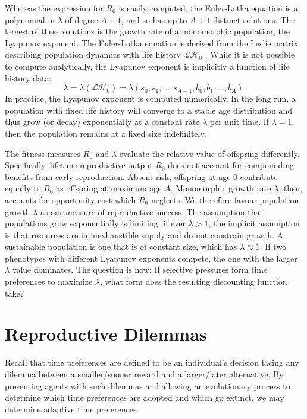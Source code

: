 \documentclass[titlepage, hidelinks, 12pt]{article}
\theoremstyle{plain}
\theoremstyle{remark}
\theoremstyle{definition}
\newcommand{\LH}{\mathcal{LH}}
\begin{document}
Whereas the expression for $R_0$ is easily computed, the Euler-Lotka equation
is a polynomial in $\lambda$ of degree $A+1$, and so has up to $A+1$ distinct solutions. The largest of these solutions is the growth
rate of a monomorphic population, the Lyapunov exponent.
The Euler-Lotka equation is derived from the Leslie matrix describing population dynamics with life history $\LH_0$ \cite{stearns92}.
While it is not possible to compute analytically, the Lyapunov exponent is implicitly a function of life history data:
\begin{equation}
    \lambda = \lambda(\LH_0) = \lambda(s_0, s_1, \ldots, s_{A-1}, b_0, b_1, \ldots, b_{A}).
    \label{eqn:lambda_function}
\end{equation}
In practice, the Lyapunov exponent is computed numerically. 
In the long run, a population with fixed life history will converge to a stable age distribution and
thus grow (or decay) 
exponentially at a constant rate $\lambda$ per unit time. If $\lambda = 1$, then the population remains at a fixed size indefinitely.

The fitness measures $R_0$ and $\lambda$ evaluate the relative value of offspring differently. Specifically, lifetime reproductive 
output $R_0$ does not account for compounding benefits from early reproduction. Absent risk, offspring at age $0$ contribute equally to
$R_0$ as offspring at maximum age $A$. Monomorphic growth rate $\lambda$, then, accounts for opportunity cost which $R_0$ neglects. 
We therefore favour population growth $\lambda$ as our measure of reproductive success. The assumption that populations grow exponentially is limiting: if
ever $\lambda > 1$,  the implicit assumption is that resources are in inexhaustible supply 
and do not constrain growth. A sustainable population is one that is of constant size, which has
$\lambda \approx 1$. If two phenotypes with different Lyapunov exponents compete, the one with the larger $\lambda$ value dominates.
The question is now: If selective pressures form time preferences to maximize $\lambda$, what form does the resulting discounting function take?


\section{Reproductive Dilemmas}
Recall that time preferences are defined to be an individual's decision facing any dilemma between a smaller/sooner reward
and a larger/later alternative. By presenting agents with such dilemmas and allowing an evolutionary process to determine which
time preferences are adopted and which go extinct, we may determine adaptive time preferences. 
\end{document}
